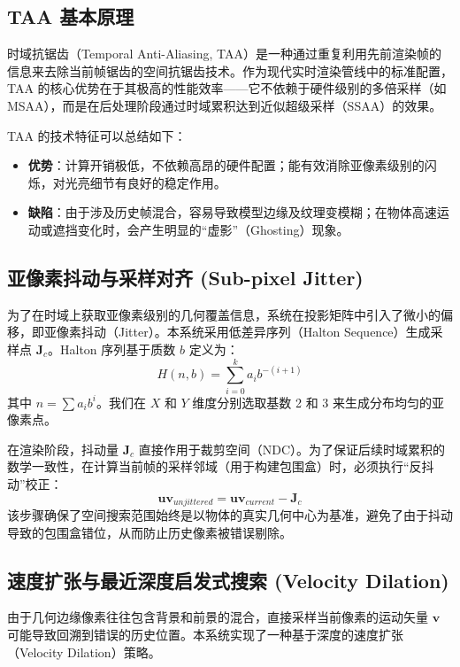 \subsection{TAA 基本原理}
时域抗锯齿（Temporal Anti-Aliasing, TAA）是一种通过重复利用先前渲染帧的信息来去除当前帧锯齿的空间抗锯齿技术。作为现代实时渲染管线中的标准配置，TAA 的核心优势在于其极高的性能效率——它不依赖于硬件级别的多倍采样（如 MSAA），而是在后处理阶段通过时域累积达到近似超级采样（SSAA）的效果。

TAA 的技术特征可以总结如下：
\begin{itemize}
    \item \textbf{优势}：计算开销极低，不依赖高昂的硬件配置；能有效消除亚像素级别的闪烁，对光亮细节有良好的稳定作用。
    \item \textbf{缺陷}：由于涉及历史帧混合，容易导致模型边缘及纹理变模糊；在物体高速运动或遮挡变化时，会产生明显的“虚影”（Ghosting）现象。
\end{itemize}

\subsection{亚像素抖动与采样对齐 (Sub-pixel Jitter)}
为了在时域上获取亚像素级别的几何覆盖信息，系统在投影矩阵中引入了微小的偏移，即亚像素抖动（Jitter）。本系统采用低差异序列（Halton Sequence）生成采样点 $\mathbf{J}_c$。Halton 序列基于质数 $b$ 定义为：
\begin{equation}
    H(n, b) = \sum_{i=0}^k a_i b^{-(i+1)}
\end{equation}
其中 $n = \sum a_i b^i$。我们在 $X$ 和 $Y$ 维度分别选取基数 2 和 3 来生成分布均匀的亚像素点。

在渲染阶段，抖动量 $\mathbf{J}_c$ 直接作用于裁剪空间（NDC）。为了保证后续时域累积的数学一致性，在计算当前帧的采样邻域（用于构建包围盒）时，必须执行“反抖动”校正：
\begin{equation}
    \mathbf{uv}_{unjittered} = \mathbf{uv}_{current} - \mathbf{J}_c
\end{equation}
该步骤确保了空间搜索范围始终是以物体的真实几何中心为基准，避免了由于抖动导致的包围盒错位，从而防止历史像素被错误剔除。

\subsection{速度扩张与最近深度启发式搜索 (Velocity Dilation)}
由于几何边缘像素往往包含背景和前景的混合，直接采样当前像素的运动矢量 $\mathbf{v}$ 可能导致回溯到错误的历史位置。本系统实现了一种基于深度的速度扩张（Velocity Dilation）策略。

